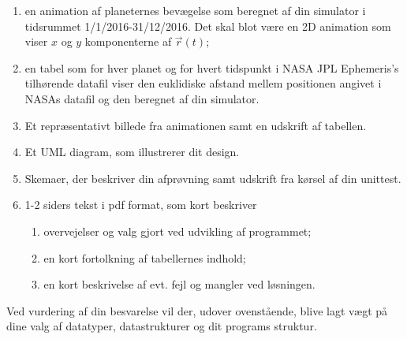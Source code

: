 \documentclass{article}
\begin{document}
\begin{enumerate}[label=11g.\arabic*,start=0]
  \begin{enumerate}
  \item en animation af planeternes bevægelse som beregnet af din simulator i tidsrummet 1/1/2016-31/12/2016. Det skal blot være en 2D animation som viser $x$ og $y$ komponenterne af $\vec{r}(t)$;  
  \item en tabel som for hver planet og for hvert tidspunkt i NASA JPL Ephemeris's tilhørende datafil viser den euklidiske afstand mellem positionen angivet i NASAs datafil og den beregnet af din simulator.
\item Et repræsentativt billede fra animationen samt en udskrift af tabellen.
\item Et UML diagram, som illustrerer dit design.
\item Skemaer, der beskriver din afprøvning samt udskrift fra kørsel af din unittest.
\item 1-2 siders tekst i pdf format, som kort beskriver
  \begin{enumerate}
  \item overvejelser og valg gjort ved udvikling af programmet;
  \item en kort fortolkning af tabellernes indhold;
  \item en kort beskrivelse af evt. fejl og mangler ved løsningen.
\end{enumerate}
\end{enumerate}
Ved vurdering af din besvarelse vil der, udover ovenstående, blive lagt vægt på dine valg af datatyper, datastrukturer og dit programs struktur.



\end{enumerate}
\end{document}

